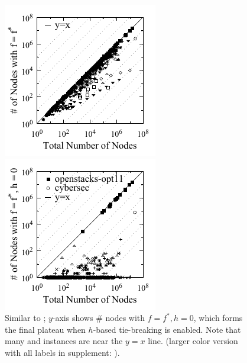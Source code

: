 \begin{figure}[htb]
 \newcommand{\minilength}{0.34\textwidth}
 \newcommand{\minisep}{0.02\textwidth}
 \begin{minipage}[t]{\minilength}
  \centering
  \includegraphics{tables/aaai16-frontier/aaai16prelim3/lmcut_frontier_noh-front-mono.pdf}
 \caption{
 The \# of nodes with $f=f^*$ (y-axis) compared to the
 total \# of nodes in the search space (x-axis) with $f\leq f^*$ on 1104 IPC benchmark problems,
  using modified Fast Downward with \lmcut which 
  generates all nodes with cost $f^*$.
  See supplement for a labeled version ()
  }
 \label{fig:plateau-noh}
 \end{minipage}
 \hfill
 \begin{minipage}[t]{\minilength}
  \centering
  \includegraphics{tables/aaai16-frontier/aaai16prelim3/lmcut_frontier-front-mono.pdf}
  \caption{
  Similar to ; $y$-axis shows
  \# nodes with $f=f^*, h=0$, which forms the final
  plateau when $h$-based tie-breaking is enabled.
  Note that many  and  instances are near the $y=x$ line.
  (larger color version with all labels in supplement: ).
}
\end{minipage}
\end{figure}
